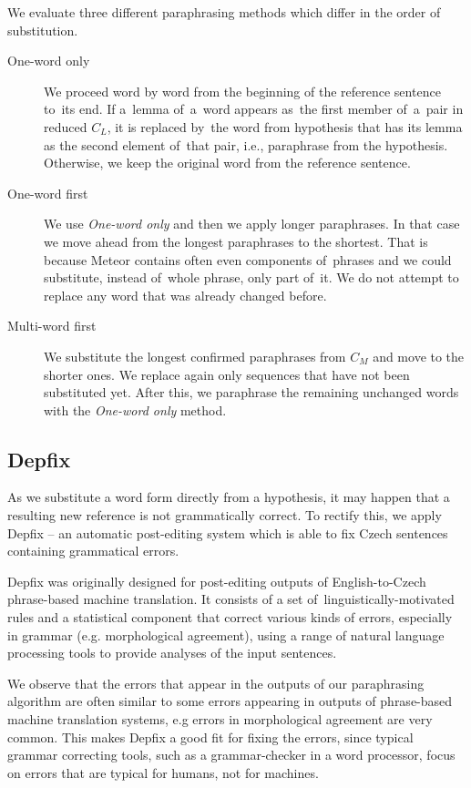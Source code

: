 \documentclass[11pt]{article}
\begin{document}
We evaluate three different paraphrasing methods which differ in the order of
substitution.

\begin{description}
\item[One-word only] We proceed word by word from the beginning of the reference 
sentence to~its end. If a~lemma of~a~word appears as~the first member of~a~pair 
in reduced $ C_{L} $, it is replaced by~the word from hypothesis that has its lemma
as the second element of~that pair, i.e., paraphrase from the hypothesis. Otherwise, 
we keep the original word from the reference sentence.
\item[One-word first] We use \textit{One-word only} and then we apply longer paraphrases.
In that case we move ahead from the longest paraphrases to the shortest. That is because 
Meteor contains often even components of~phrases and we could substitute, instead of~whole 
phrase, only part of~it. We do not attempt to replace any word that was already changed 
before.
\item[Multi-word first] We substitute the longest confirmed paraphrases from
$ C_{M} $ and move to the shorter ones. We replace again only sequences that have not
been substituted yet. After this, we paraphrase the remaining unchanged words
with the \textit{One-word only} method.
\end{description}

\subsection{Depfix}
As we substitute a word form directly from a hypothesis, it may happen that a 
resulting new reference is not grammatically correct. To rectify this, we apply
Depfix \cite{depfix} -- an automatic post-editing system which is able to fix 
Czech sentences containing grammatical errors.

Depfix was originally designed for post-editing outputs of English-to-Czech 
phrase-based machine translation. It consists of a set of~linguistically-motivated 
rules and a statistical component that correct various kinds of errors, especially 
in grammar (e.g. morphological agreement), using a range of natural language 
processing tools to provide analyses of the input sentences.

We observe that the errors that appear in the outputs of our paraphrasing 
algorithm are often similar to some errors appearing in outputs of phrase-based
machine translation systems, e.g errors in morphological agreement are very 
common. This makes Depfix a good fit for fixing the errors, since typical 
grammar correcting tools, such as a grammar-checker in a word processor, focus
on errors that are typical for humans, not for machines. 
\end{document}
